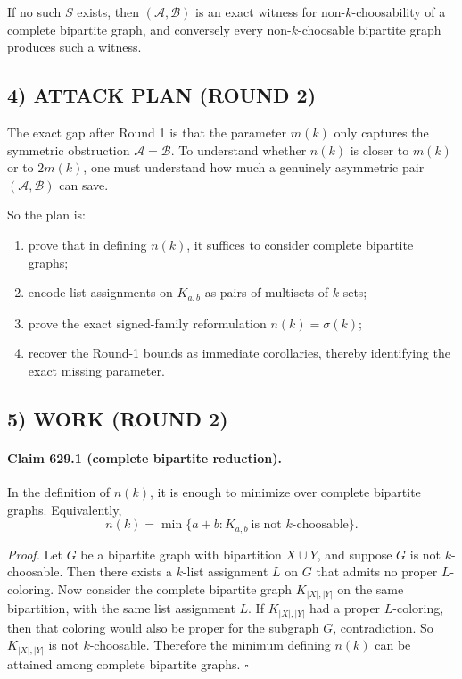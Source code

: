 If no such \(S\) exists, then \((\mathcal A,\mathcal B)\) is an exact witness for non-\(k\)-choosability of a complete bipartite graph, and conversely every non-\(k\)-choosable bipartite graph produces such a witness.

\subsection*{4) ATTACK PLAN (ROUND 2)}

The exact gap after Round 1 is that the parameter \(m(k)\) only captures the symmetric obstruction
\(\mathcal A=\mathcal B\). To understand whether \(n(k)\) is closer to \(m(k)\) or to \(2m(k)\),
one must understand how much a genuinely asymmetric pair \((\mathcal A,\mathcal B)\) can save.

So the plan is:

\begin{enumerate}
\item prove that in defining \(n(k)\), it suffices to consider complete bipartite graphs;
\item encode list assignments on \(K_{a,b}\) as pairs of multisets of \(k\)-sets;
\item prove the exact signed-family reformulation \(n(k)=\sigma(k)\);
\item recover the Round-1 bounds as immediate corollaries, thereby identifying the exact missing parameter.
\end{enumerate}

\subsection*{5) WORK (ROUND 2)}

\paragraph{Claim 629.1 (complete bipartite reduction).}
In the definition of \(n(k)\), it is enough to minimize over complete bipartite graphs.
Equivalently,
\[
n(k)=\min\{a+b: K_{a,b}\ \text{is not \(k\)-choosable}\}.
\]

\emph{Proof.}
Let \(G\) be a bipartite graph with bipartition \(X\cup Y\), and suppose \(G\) is not \(k\)-choosable.
Then there exists a \(k\)-list assignment \(L\) on \(G\) that admits no proper \(L\)-coloring.
Now consider the complete bipartite graph \(K_{|X|,|Y|}\) on the same bipartition, with the same list assignment \(L\).
If \(K_{|X|,|Y|}\) had a proper \(L\)-coloring, then that coloring would also be proper for the subgraph \(G\), contradiction.
So \(K_{|X|,|Y|}\) is not \(k\)-choosable.
Therefore the minimum defining \(n(k)\) can be attained among complete bipartite graphs. \(\square\)

